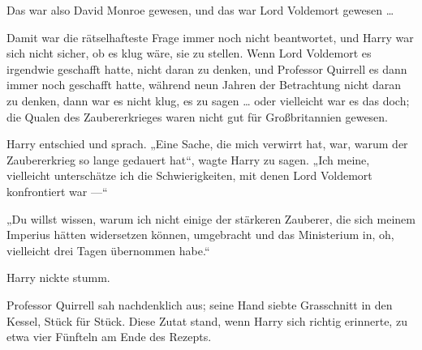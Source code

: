 Das war also David Monroe gewesen, und das war Lord Voldemort gewesen …

Damit war die rätselhafteste Frage immer noch nicht beantwortet, und Harry war sich nicht sicher, ob es klug wäre, sie zu stellen. Wenn Lord Voldemort es irgendwie geschafft hatte, nicht daran zu denken, und Professor Quirrell es dann immer noch geschafft hatte, während neun Jahren der Betrachtung nicht daran zu denken, dann war es nicht klug, es zu sagen … oder vielleicht war es das doch; die Qualen des Zaubererkrieges waren nicht gut für Großbritannien gewesen.

Harry entschied und sprach.
„Eine Sache, die mich verwirrt hat, war, warum der Zaubererkrieg so lange gedauert hat“, wagte Harry zu sagen.
„Ich meine, vielleicht unterschätze ich die Schwierigkeiten, mit denen Lord Voldemort konfrontiert war —“

„Du willst wissen, warum ich nicht einige der stärkeren Zauberer, die sich meinem Imperius hätten widersetzen können, umgebracht und das Ministerium in, oh, vielleicht drei Tagen übernommen habe.“

Harry nickte stumm.

Professor Quirrell sah nachdenklich aus; seine Hand siebte Grasschnitt in den Kessel, Stück für Stück. Diese Zutat stand, wenn Harry sich richtig erinnerte, zu etwa vier Fünfteln am Ende des Rezepts.

